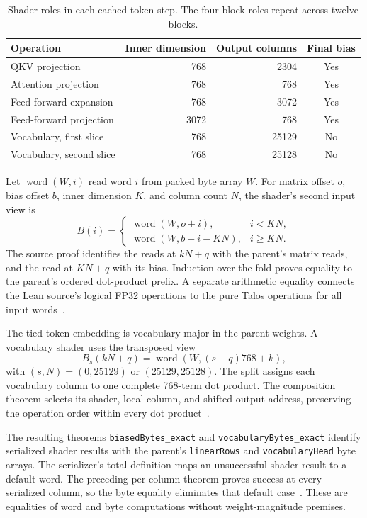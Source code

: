 \documentclass[11pt]{article}
\newcommand{\code}[1]{\texttt{#1}}
\begin{document}
\begin{table}[ht]
\centering
\begin{tabular}{lrrc}
\toprule
Operation & Inner dimension & Output columns & Final bias\\
\midrule
QKV projection & 768 & 2304 & Yes\\
Attention projection & 768 & 768 & Yes\\
Feed-forward expansion & 768 & 3072 & Yes\\
Feed-forward projection & 3072 & 768 & Yes\\
Vocabulary, first slice & 768 & 25129 & No\\
Vocabulary, second slice & 768 & 25128 & No\\
\bottomrule
\end{tabular}
\caption{Shader roles in each cached token step.  The four block roles repeat across twelve blocks.}
\label{tab:kernels}
\end{table}

Let $\operatorname{word}(W,i)$ read word $i$ from packed byte array $W$.  For matrix offset $o$, bias offset $b$, inner dimension $K$, and column count $N$, the shader's second input view is
\[
B(i)=\begin{cases}
\operatorname{word}(W,o+i),&i<KN,\\
\operatorname{word}(W,b+i-KN),&i\geq KN.
\end{cases}
\]
The source proof identifies the reads at $kN+q$ with the parent's matrix reads, and the read at $KN+q$ with its bias.  Induction over the fold proves equality to the parent's ordered dot-product prefix.  A separate arithmetic equality connects the Lean source's logical FP32 operations to the pure Talos operations for all input words~\cite{packedsource}.

The tied token embedding is vocabulary-major in the parent weights.  A vocabulary shader uses the transposed view
\[
B_s(kN+q)=\operatorname{word}(W,(s+q)768+k),
\]
with $(s,N)=(0,25129)$ or $(25129,25128)$.  The split assigns each vocabulary column to one complete 768-term dot product.  The composition theorem selects its shader, local column, and shifted output address, preserving the operation order within every dot product~\cite{packedsource}.

The resulting theorems \code{biasedBytes\_exact} and \code{vocabularyBytes\_exact} identify serialized shader results with the parent's \code{linearRows} and \code{vocabularyHead} byte arrays.  The serializer's total definition maps an unsuccessful shader result to a default word.  The preceding per-column theorem proves success at every serialized column, so the byte equality eliminates that default case~\cite{packedshader}.  These are equalities of word and byte computations without weight-magnitude premises.
\end{document}
